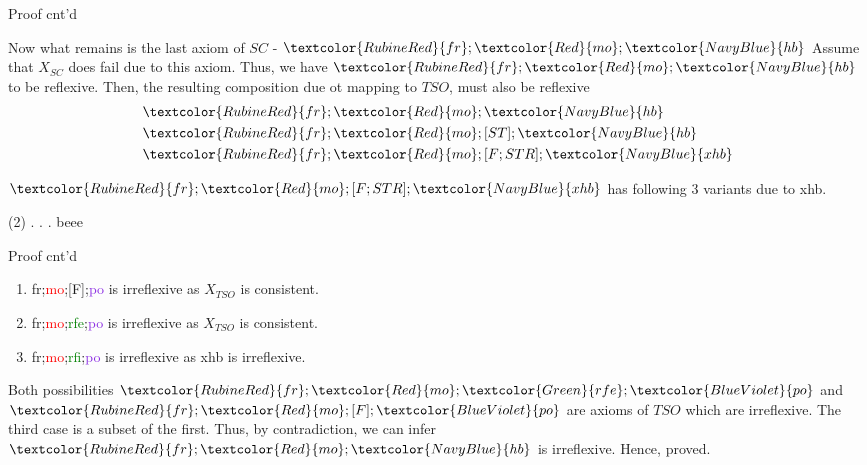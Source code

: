 \documentclass[xcolor={dvipsnames}, notes]{beamer}
\newcommand{\po}{\textcolor{BlueViolet}{po}}
\newcommand{\mo}{\textcolor{Red}{mo}}
\newcommand{\hb}{\textcolor{NavyBlue}{hb}}
\newcommand{\fr}{\textcolor{RubineRed}{fr}}
\newcommand{\xhb}{\textcolor{NavyBlue}{xhb}}
\newcommand{\rfe}{\textcolor{Green}{rfe}}
\newcommand{\rfi}{\textcolor{Green}{rfi}}
\begin{document}
    \begin{frame}{Proof cnt'd}
        
        Now what remains is the last axiom of $SC$ - ${\fr;\mo;\hb}$
        Assume that $X_{SC}$ does fail due to this axiom.
        Thus, we have ${\fr;\mo;\hb}$ to be reflexive. 
        Then, the resulting composition due ot mapping to $TSO$, must also be reflexive 
        \begin{align*}
            &{\fr;\mo;\hb} \\
            &{\fr;\mo;[ST];\hb} \\
            &{\fr;\mo;[F;STR];\xhb}  
        \end{align*}

        $\fr;\mo;[F;STR];\xhb$ has following 3 variants due to {\xhb}.
        \begin{tasks}(2)
            \task {\fr;\mo;[F];\po}.
            \task {\fr;\mo;\rfe;\po}.
            \task {\fr;\mo;\rfi;\po}.
            \task beee
        \end{tasks}
        
    \end{frame}

    \begin{frame}{Proof cnt'd}
        
        \begin{enumerate}
            \item {\fr;\mo;[F];\po} is irreflexive as $X_{TSO}$ is consistent.
            \item {\fr;\mo;\rfe;\po} is irreflexive as $X_{TSO}$ is consistent.
            \item {\fr;\mo;\rfi;\po} is irreflexive as {\xhb} is irreflexive. 
        \end{enumerate}

        Both possibilities $\fr;\mo;\rfe;\po$ and $\fr;\mo;[F];\po$ are axioms of $TSO$ which are irreflexive.
        The third case is a subset of the first. 
        Thus, by contradiction, we can infer $\fr;\mo;\hb$ is irreflexive.
        Hence, proved.

    \end{frame}

\end{document}
